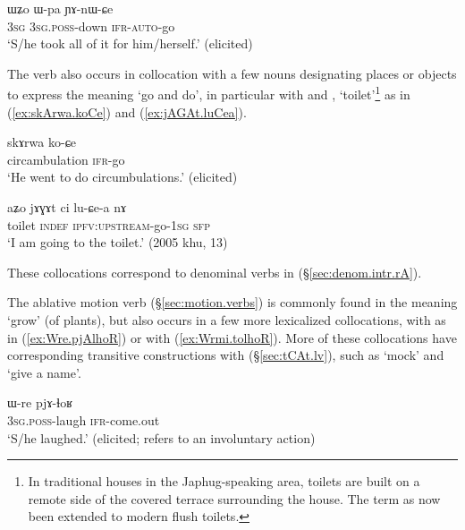 \begin{exe}
\ex \label{ex:Wpa.YAnWCe}
\gll ɯʑo ɯ-pa ɲɤ-nɯ-ɕe \\
\textsc{3sg} \textsc{3sg}.\textsc{poss}-down \textsc{ifr}-\textsc{auto}-go \\
\glt `S/he took all of it for him/herself.' (elicited)
\end{exe}

The verb  also occurs in collocation with a few nouns designating places or objects to express the meaning `go and do', in particular with  and , `toilet'\footnote{In traditional houses in the Japhug-speaking area, toilets are built on a remote side of the covered terrace surrounding the house. The term as now been extended to modern flush toilets.} as in (\ref{ex:skArwa.koCe}) and (\ref{ex:jAGAt.luCea}).

 \begin{exe}
	\ex \label{ex:skArwa.koCe}
	\gll skɤrwa ko-ɕe \\
	circambulation \textsc{ifr}-go \\
	\glt `He went to do circumbulations.' (elicited)
\end{exe}

 \begin{exe}
	\ex \label{ex:jAGAt.luCea}
	\gll  aʑo jɤɣɤt ci lu-ɕe-a nɤ \\
		 toilet \textsc{indef} \textsc{ipfv}:\textsc{upstream}-go-\textsc{1sg} \textsc{sfp} \\
	\glt `I am going to the toilet.' (2005 khu, 13) 
\end{exe}

These collocations correspond to denominal verbs in  (§\ref{sec:denom.intr.rA}).


The ablative motion verb  (§\ref{sec:motion.verbs}) is commonly found in the meaning `grow' (of plants), but also occurs in a few more lexicalized collocations, with  as in (\ref{ex:Wre.pjAlhoR}) or with  (\ref{ex:Wrmi.tolhoR}). More of these collocations have corresponding transitive constructions with  (§\ref{sec:tCAt.lv}), such as  `mock' and  `give a name'.

\begin{exe}
\ex \label{ex:Wre.pjAlhoR}
\gll ɯ-re pjɤ-ɬoʁ \\
\textsc{3sg}.\textsc{poss}-laugh \textsc{ifr}-come.out \\
\glt `S/he laughed.' (elicited; refers to an involuntary action)
\end{exe}


